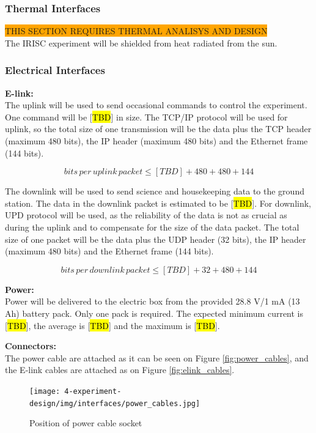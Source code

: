 % 


\subsubsection{Thermal Interfaces}
    \colorbox{orange}{THIS SECTION REQUIRES THERMAL ANALISYS AND DESIGN}\\
The IRISC experiment will be shielded from heat radiated from the sun.
\label{sec:4.2.2}


\subsubsection{Electrical Interfaces}
\label{sec:4.2.3}
\textbf{E-link:}\\
The uplink will be used to send occasional commands to control the experiment. One command will be [\hl{TBD}] in size. The TCP/IP protocol will be used for uplink, so the total size of one transmission will be the data plus the TCP header (maximum 480 bits), the IP header (maximum 480 bits) and the Ethernet frame (144 bits). 

$$ bits\, per\, uplink\, packet \leq [TBD] + 480 + 480 + 144 $$

The downlink will be used to send science and housekeeping data to the ground station. The data in the downlink packet is estimated to be [\hl{TBD}]. For downlink, UPD protocol will be used, as the reliability of the data is not as crucial as during the uplink and to compensate for the size of the data packet. The total size of one packet will be the data plus the UDP header (32 bits), the IP header (maximum 480 bits) and the Ethernet frame (144 bits).

$$ bits\, per\, downlink\, packet \leq [TBD] + 32 + 480 + 144 $$

\textbf{Power:}\\
Power will be delivered to the electric box from the provided 28.8 V/1 mA (13 Ah) battery pack. Only one pack is required. The expected minimum current is [\hl{TBD}], the average is [\hl{TBD}] and the maximum is [\hl{TBD}].

\textbf{Connectors:}\\
The power cable are attached as it can be seen on Figure \ref{fig:power_cables}, and the E-link cables are attached as on Figure \ref{fig:elink_cables}.

\begin{figure}[H]
    \centering
	\texttt{[image: 4-experiment-design/img/interfaces/power\_cables.jpg]}
	\caption{Position of power cable socket}
\end{figure}

